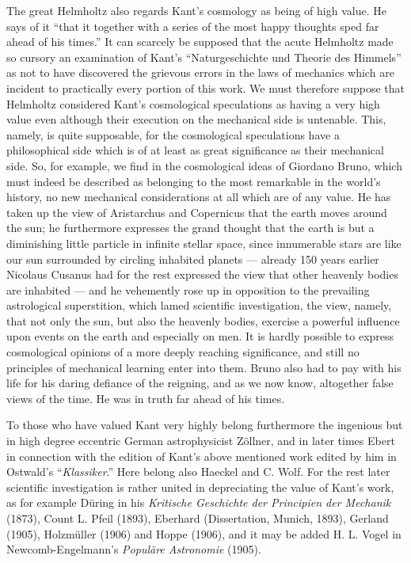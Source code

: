 \documentclass[a4paper, 11pt, oneside, polutonikogreek, english]{article}
\begin{document}
The great Helmholtz also regards Kant's cosmology as being of high value. He says of it ``that it together with a series of the most happy thoughts sped far ahead of his times.'' It can scarcely be supposed that the acute Helmholtz made so cursory an examination of Kant's ``Naturgeschichte und Theorie des Himmels'' as not to have discovered the grievous errors in the laws of mechanics which are incident to practically every portion of this work. We must therefore suppose that Helmholtz considered Kant's cosmological speculations as having a very high value even although their execution on the mechanical side is untenable. This, namely, is quite supposable, for the cosmological speculations have a philosophical side which is of at least as great significance as their mechanical side. So, for example, we find in the cosmological ideas of Giordano Bruno, which must indeed be described as belonging to the most remarkable in the world's history, no new mechanical considerations at all which are of any value. He has taken up the view of Aristarchus and Copernicus that the earth moves around the sun; he furthermore expresses the grand thought that the earth is but a diminishing little particle in infinite stellar space, since innumerable stars are like our sun surrounded by circling inhabited planets --- already 150 years earlier Nicolaus Cusanus had for the rest expressed the view that other heavenly bodies are inhabited --- and he vehemently rose up in opposition to the prevailing astrological superstition, which lamed scientific investigation, the view, namely, that not only the sun, but also the heavenly bodies, exercise a powerful influence upon events on the earth and especially on men. It is hardly possible to express cosmological opinions of a more deeply reaching significance, and still no principles of mechanical learning enter into them. Bruno also had to pay with his life for his daring defiance of the reigning, and as we now know, altogether false views of the time. He was in truth far ahead of his times.

To those who have valued Kant very highly belong furthermore the ingenious but in high degree eccentric German astrophysicist Zöllner, and in later times Ebert in connection with the edition of Kant's above mentioned work edited by him in Ostwald's ``\emph{Klassiker}.'' Here belong also Haeckel and C. Wolf. For the rest later scientific investigation is rather united in depreciating the value of Kant's work, as for example Düring in his \emph{Kritische Geschichte der Principien der Mechanik} (1873), Count L. Pfeil (1893), Eberhard (Dissertation, Munich, 1893), Gerland (1905), Holzmüller (1906) and Hoppe (1906), and it may be added H. L. Vogel in Newcomb-Engelmann's \emph{Populäre Astronomie} (1905).
\end{document}
